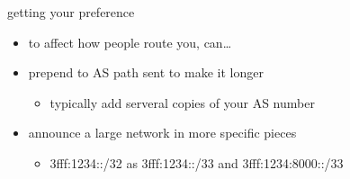 \begin{frame}{getting your preference}
    \begin{itemize}
    \item to affect how people route you, can\ldots
    \vspace{.5cm}
    \item prepend to AS path sent to make it longer
        \begin{itemize}
        \item typically add serveral copies of your AS number
        \end{itemize}
    \item announce a large network in more specific pieces
        \begin{itemize}
        \item 3fff:1234::/32 as 3fff:1234::/33 and 3fff:1234:8000::/33
        \end{itemize}
    \end{itemize}
\end{frame}
